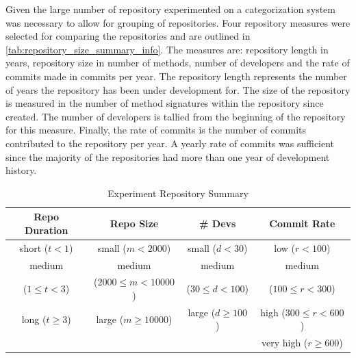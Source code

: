 Given the large number of repository experimented on a categorization system was necessary to allow for grouping of repositories. Four repository measures were selected for comparing the repositories and are outlined in \autoref{tab:repository_size_summary_info}. The measures are: repository length in years, repository size in number of methods, number of developers and the rate of commits made in commits per year. The repository length represents the number of years the repository has been under development for. The size of the repository is measured in the number of method signatures within the repository since created. The number of developers is tallied from the beginning of the repository for this measure. Finally, the rate of commits is the number of commits contributed to the repository per year. A yearly rate of commits was sufficient since the majority of the repositories had more than one year of development history.


\begin{table}
\begin{center}
    \begin{tabular}{|c|c|c|c|}
        \hline
        Repo Duration & Repo Size & \# Devs & Commit Rate \\
        \hline
        \hline
        short ($t < 1$) & small ($m < 2000$) & small ($d < 30$) & low ($r < 100$) \\
        \hline
        medium & medium & medium & medium \\
        ($1 \leq t < 3$) & ($2000 \leq m < 10000$) & ($30 \leq d < 100$) & ($100 \leq r < 300$) \\
        \hline
        long ($t \geq 3$) & large ($m \geq 10000$) & large ($d \geq 100$) & high ($300 \leq r < 600$) \\
        \hline
        & & & very high ($r \geq 600$) \\
        \hline
    \end{tabular}
\end{center}
\caption{Experiment Repository Summary}
\label{tab:repository_size_summary_info}
\end{table}


